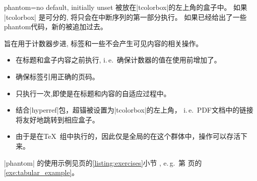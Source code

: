 \begin{docTcbKey}{phantom}{=}{no default, initially unset}
被放在|tcolorbox|的左上角的盒子中。%
如果 |tcolorbox| 是可分的,  将只会在中断序列的第一部分执行。%
如果已经给出了一些phantom代码，新的被追加过去。\par
{}旨在用于计数器步进, 标签和一些不会产生可见内容的相关操作。
\begin{itemize}
\item 
在标题和盒子内容之前执行, i.\,e.\ 确保计数器的值在使用前增加了。
\item %
确保标签引用正确的页码。
\item 
只执行一次,即使是在标题和内容的自适应过程中。
\item 
结合|hyperref|包，超锚被设置为|tcolorbox|的左上角， i.\,e.\ PDF文档中的链接将友好地跳转到相应盒子。

\item 
由于是在\TeX\ 组中执行的，因此仅是全局的在这个群体中，操作可以存活下来。
\end{itemize}
|phantom| 的使用示例见\pageref{listing:exercises}页的\ref{listing:exercises}小节
, e.\,g.\ 第 \pageref{exe:tabular_example} 页的 \ref{exe:tabular_example}。
\end{docTcbKey}


